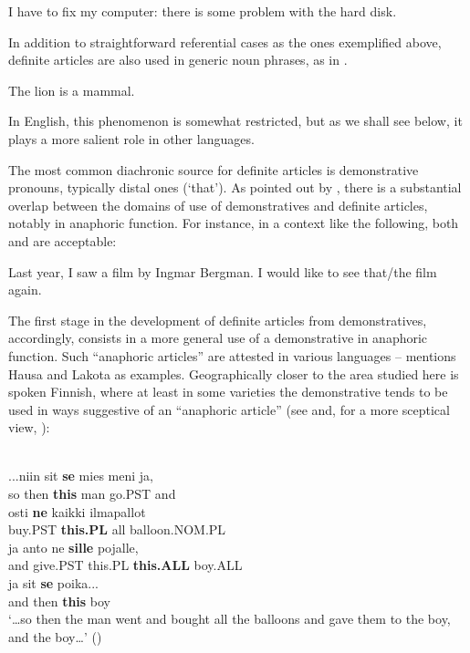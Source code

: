 \ea
	\gl	\label{bkm:Ref75942712}I have to fix my computer: there is some problem with the hard disk. 
\z 

In addition to straightforward referential cases as the ones exemplified above, definite articles are also used in generic noun phrases, as in . 

\ea 
	\gl	\label{bkm:Ref123549675}The lion is a mammal.
\z 

In English, this phenomenon is somewhat restricted, but as we shall see below, it plays a more salient role in other languages.

The most common diachronic source for definite articles is demonstrative pronouns, typically distal ones (‘that’). As pointed out by \citet[332]{Lyons1999}, there is a substantial overlap between the domains of use of demonstratives and definite articles, notably in anaphoric function. For instance, in a context like the following, both  and  are acceptable:

\ea 
	\gl Last year, I saw a film by Ingmar Bergman. I would like to see that/the film again.
\z 

The first stage in the development of definite articles from demonstratives, accordingly, consists in a more general use of a demonstrative in anaphoric function. Such “anaphoric articles” are attested in various languages – \citet[53-54]{Lyons1999} mentions Hausa and Lakota as examples. Geographically closer to the area studied here is spoken Finnish, where at least in some varieties the demonstrative tends to be used in ways suggestive of an “anaphoric article” (see \citet{Laury1997} and, for a more sceptical view, \citet{Juvonen2000}):

\ea\label{}
\\
\gll	...niin  sit  \textbf{se} mies  meni  ja,\\
		so  then  \textbf{this} man  go.PST  and\\
\gll	osti  \textbf{ne} kaikki  ilmapallot\\
		buy.PST  \textbf{this.PL} all  balloon.NOM.PL\\
\gll	ja  anto  ne  \textbf{sille} pojalle,\\
		and  give.PST  this.PL  \textbf{this.ALL} boy.ALL\\
		
\gll 	ja  sit  \textbf{se} poika...\\
		and then  \textbf{this} boy\\
\glt 	‘…so then the man went and bought all the balloons and gave them to the boy, and the boy…’ (\citet[136]{Juvonen2000})

